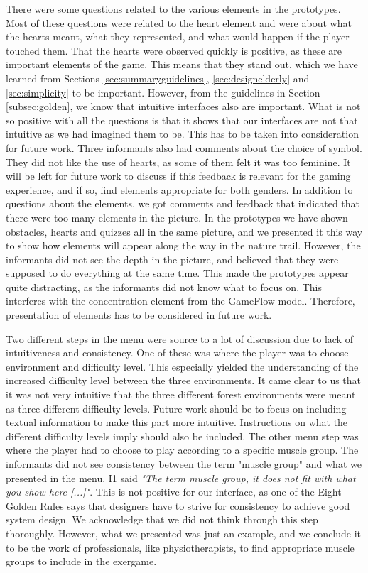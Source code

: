 There were some questions related to the various elements in the prototypes. Most of these questions were related to the heart element and were about what the hearts meant, what they represented, and what would happen if the player touched them. That the hearts were observed quickly is positive, as these are important elements of the game. This means that they stand out, which we have learned from Sections \ref{sec:summaryguidelines}, \ref{sec:designelderly} and \ref{sec:simplicity} to be important. However, from the guidelines in Section \ref{subsec:golden}, we know that intuitive interfaces also are important. What is not so positive with all the questions is that it shows that our interfaces are not that intuitive as we had imagined them to be. This has to be taken into consideration for future work. Three informants also had comments about the choice of symbol. They did not like the use of hearts, as some of them felt it was too feminine. It will be left for future work to discuss if this feedback is relevant for the gaming experience, and if so, find elements appropriate for both genders. In addition to questions about the elements, we got comments and feedback that indicated that there were too many elements in the picture. In the prototypes we have shown obstacles, hearts and quizzes all in the same picture, and we presented it this way to show how elements will appear along the way in the nature trail. However, the informants did not see the depth in the picture, and believed that they were supposed to do everything at the same time. This made the prototypes appear quite distracting, as the informants did not know what to focus on. This interferes with the concentration element from the GameFlow model. Therefore, presentation of elements has to be considered in future work. 

Two different steps in the menu were source to a lot of discussion due to lack of intuitiveness and consistency. One of these was where the player was to choose environment and difficulty level. This especially yielded the understanding of the increased difficulty level between the three environments. It came clear to us that it was not very intuitive that the three different forest environments were meant as three different difficulty levels. Future work should be to focus on including textual information to make this part more intuitive. Instructions on what the different difficulty levels imply should also be included.  The other menu step was where the player had to choose to play according to a specific muscle group. The informants did not see consistency between the term "muscle group" and what we presented in the menu. I1 said \emph{"The term muscle group, it does not fit with what you show here [...]"}. This is not positive for our interface, as one of the Eight Golden Rules says that designers have to strive for consistency to achieve good system design. We acknowledge that we did not think through this step thoroughly. However, what we presented was just an example, and we conclude it to be the work of professionals, like physiotherapists, to find appropriate muscle groups to include in the exergame.

